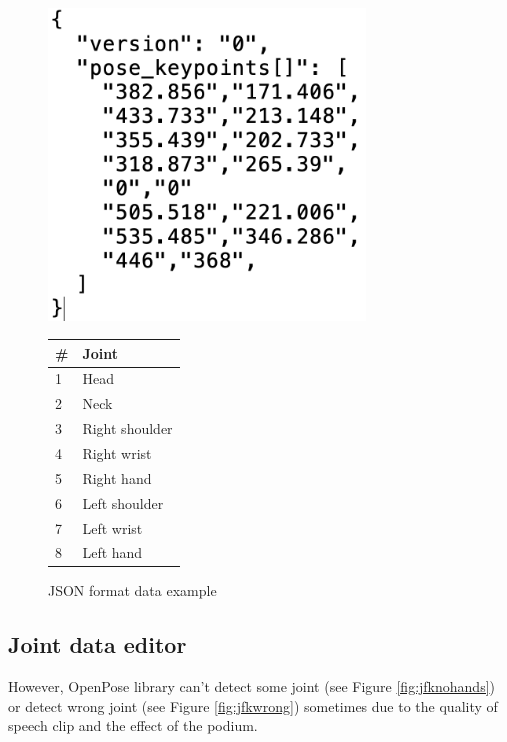 \begin{figure}[!htbp]
  \begin{minipage}[b]{0.4\textwidth}
\centering\includegraphics[width=0.75\textwidth]{./img/json.png}
  \caption{JSON format data example}
  \label{fig:json}
\end{minipage}
  \begin{minipage}[b]{0.6\textwidth}
\centering
\begin{tabular}{ll}
\hline
\# & Joint \\ \hline
1 & Head \\
2 & Neck \\
3 & Right shoulder \\
4 & Right wrist \\
5 & Right hand \\
6 & Left shoulder \\
7 & Left wrist \\
8 & Left hand \\ \hline
\end{tabular}
  \label{tab:jointorder}
\end{minipage}
\end{figure}

\subsection*{Joint data editor}%
\label{sub:joint_data_editor}
\par However, OpenPose library can't detect some joint (see Figure \ref{fig:jfknohands}) or detect wrong joint (see Figure \ref{fig:jfkwrong}) sometimes due to the quality of speech clip and the effect of the podium.   

